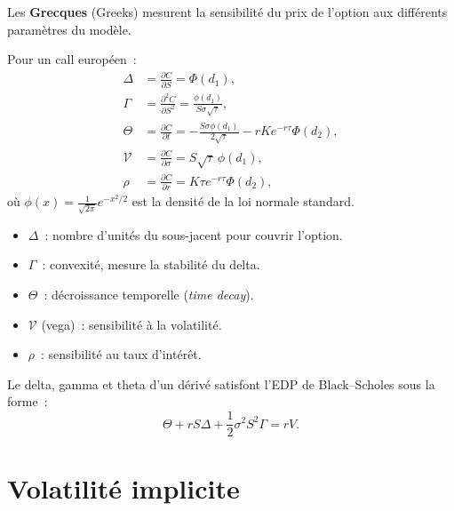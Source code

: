 Les \textbf{Grecques} (Greeks) mesurent la sensibilit\'e du prix de
l'option aux diff\'erents param\`etres du mod\`ele.

\begin{definition}
Pour un call europ\'een~:
\begin{align*}
    \Delta &= \frac{\partial C}{\partial S} = \Phi(d_1), \\
    \Gamma &= \frac{\partial^2 C}{\partial S^2}
            = \frac{\phi(d_1)}{S\sigma\sqrt{\tau}}, \\
    \Theta &= \frac{\partial C}{\partial t}
            = -\frac{S\sigma\phi(d_1)}{2\sqrt{\tau}} - rKe^{-r\tau}\Phi(d_2), \\
    \mathcal{V} &= \frac{\partial C}{\partial \sigma}
                  = S\sqrt{\tau}\,\phi(d_1), \\
    \rho &= \frac{\partial C}{\partial r} = K\tau e^{-r\tau}\Phi(d_2),
\end{align*}
o\`u $\phi(x) = \frac{1}{\sqrt{2\pi}}e^{-x^2/2}$ est la densit\'e
de la loi normale standard.
\end{definition}

\begin{intuition}[title=\textbf{Interpr\'etation des Grecques}]
\begin{itemize}
    \item $\Delta$~: nombre d'unit\'es du sous-jacent pour couvrir l'option.
    \item $\Gamma$~: convexit\'e, mesure la stabilit\'e du delta.
    \item $\Theta$~: d\'ecroissance temporelle (\textit{time decay}).
    \item $\mathcal{V}$ (vega)~: sensibilit\'e \`a la volatilit\'e.
    \item $\rho$~: sensibilit\'e au taux d'int\'er\^et.
\end{itemize}
\end{intuition}

\begin{proposition}
Le delta, gamma et theta d'un d\'eriv\'e satisfont l'EDP de Black--Scholes
sous la forme~:
\[
    \Theta + rS\Delta + \frac{1}{2}\sigma^2 S^2 \Gamma = rV.
\]
\end{proposition}

\section{Volatilit\'e implicite}


